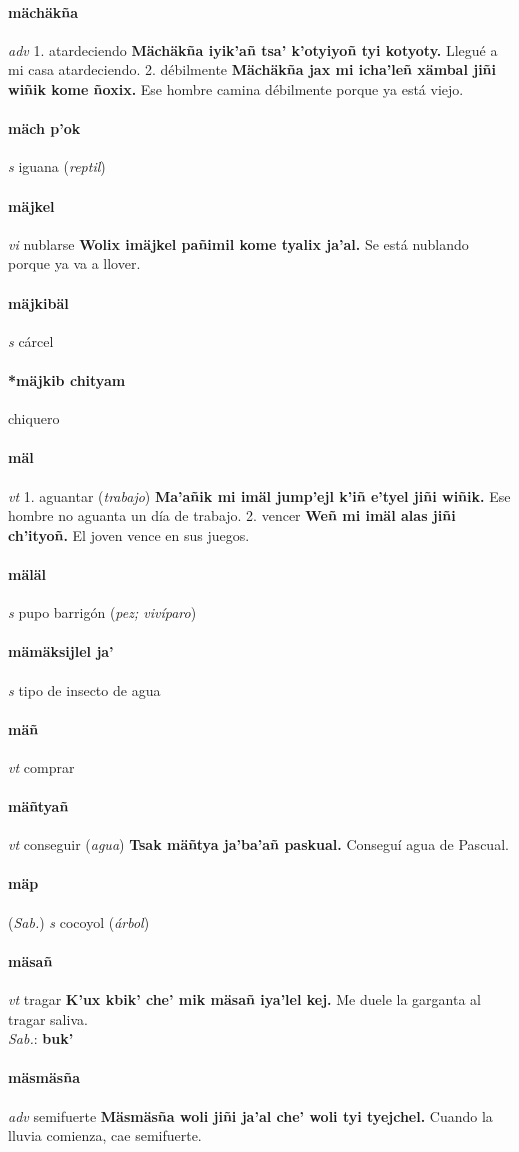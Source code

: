 \documentclass{scrbook}
\newcommand{\entry}[1]{\paragraph{#1}}
\newcommand{\onedefinition}[1]{#1.}
\newcommand{\partofspeech}[1]{\textit{#1}}
\newcommand{\spanishtranslation}[1]{#1}
\newcommand{\clarification}[1]{(\textit{#1})}
\newcommand{\cholexample}[1]{\textbf{#1}}
\newcommand{\exampletranslation}[1]{#1}
\newcommand{\dialectvariant}[1]{\\\textit{#1}:}
\newcommand{\dialectword}[1]{\textbf{#1}}
\newcommand{\relevantdialect}[1]{(\textit{#1})}
\begin{document}
\begin{multicols}{2}
\entry{mächäkña}
\partofspeech{adv}
\onedefinition{1}
\spanishtranslation{atardeciendo}
\cholexample{Mächäkña iyik'añ tsa' k'otyiyoñ tyi kotyoty.}
\exampletranslation{Llegué a mi casa atardeciendo.}
\onedefinition{2}
\spanishtranslation{débilmente}
\cholexample{Mächäkña jax mi icha'leñ xämbal jiñi wiñik kome ñoxix.}
\exampletranslation{Ese hombre camina débilmente porque ya está viejo.}

\entry{mäch p'ok}
\partofspeech{s}
\spanishtranslation{iguana}
\clarification{reptil}

\entry{mäjkel}
\partofspeech{vi}
\spanishtranslation{nublarse}
\cholexample{Wolix imäjkel pañimil kome tyalix ja'al.}
\exampletranslation{Se está nublando porque ya va a llover.}

\entry{mäjkibäl}
\partofspeech{s}
\spanishtranslation{cárcel}

\entry{*mäjkib chityam}
\spanishtranslation{chiquero}

\entry{mäl}
\partofspeech{vt}
\onedefinition{1}
\spanishtranslation{aguantar}
\clarification{trabajo}
\cholexample{Ma'añik mi imäl jump'ejl k'iñ e'tyel jiñi wiñik.}
\exampletranslation{Ese hombre no aguanta un día de trabajo.}
\onedefinition{2}
\spanishtranslation{vencer}
\cholexample{Weñ mi imäl alas jiñi ch'ityoñ.}
\exampletranslation{El joven vence en sus juegos.}

\entry{mäläl}
\partofspeech{s}
\spanishtranslation{pupo barrigón}
\clarification{pez; vivíparo}

\entry{mämäksijlel ja'}
\partofspeech{s}
\spanishtranslation{tipo de insecto de agua}

\entry{mäñ}
\partofspeech{vt}
\spanishtranslation{comprar}

\entry{mäñtyañ}
\partofspeech{vt}
\spanishtranslation{conseguir}
\clarification{agua}
\cholexample{Tsak mäñtya ja'ba'añ paskual.}
\exampletranslation{Conseguí agua de Pascual.}

\entry{mäp}
\relevantdialect{Sab.}
\partofspeech{s}
\spanishtranslation{cocoyol}
\clarification{árbol}

\entry{mäsañ}
\partofspeech{vt}
\spanishtranslation{tragar}
\cholexample{K'ux kbik' che' mik mäsañ iya'lel kej.}
\exampletranslation{Me duele la garganta al tragar saliva.}
\dialectvariant{Sab.}
\dialectword{buk'}

\entry{mäsmäsña}
\partofspeech{adv}
\spanishtranslation{semifuerte}
\cholexample{Mäsmäsña woli jiñi ja'al che' woli tyi tyejchel.}
\exampletranslation{Cuando la lluvia comienza, cae semifuerte.}


\end{multicols}
\end{document}
